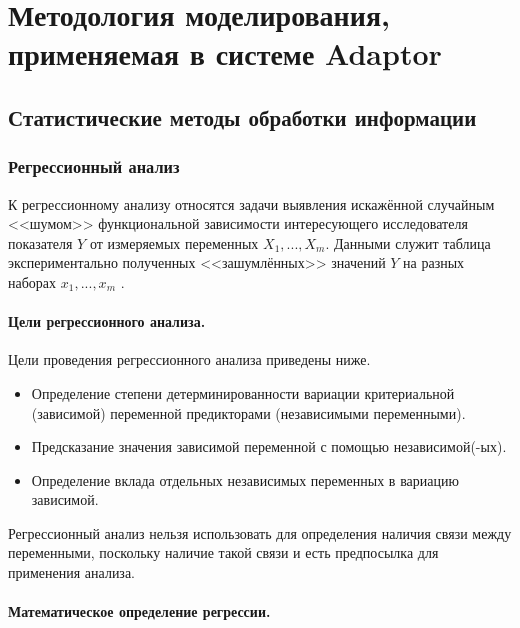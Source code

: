 \section{Методология моделирования, применяемая в системе Adaptor}
\subsection{Статистические методы обработки информации}
\subsubsection{Регрессионный анализ}

К регрессионному анализу относятся задачи выявления искажённой случайным <<шумом>> функциональной зависимости интересующего исследователя показателя $Y$ от измеряемых переменных $X_1,...,X_m$. Данными служит таблица экспериментально полученных <<зашумлённых>> значений $Y$ на разных наборах $x_1,...,x_m$ \cite{lag}.

\paragraph{Цели регрессионного анализа.}
Цели проведения регрессионного анализа приведены ниже.
\begin{itemize}
    \item Определение степени детерминированности вариации критериальной (зависимой) переменной предикторами (независимыми переменными).
    \item Предсказание значения зависимой переменной с помощью независимой(-ых).
    \item Определение вклада отдельных независимых переменных в вариацию зависимой.
\end{itemize}

Регрессионный анализ нельзя использовать для определения наличия связи между переменными, поскольку наличие такой связи и есть предпосылка для применения анализа.

\paragraph{Математическое определение регрессии.}

